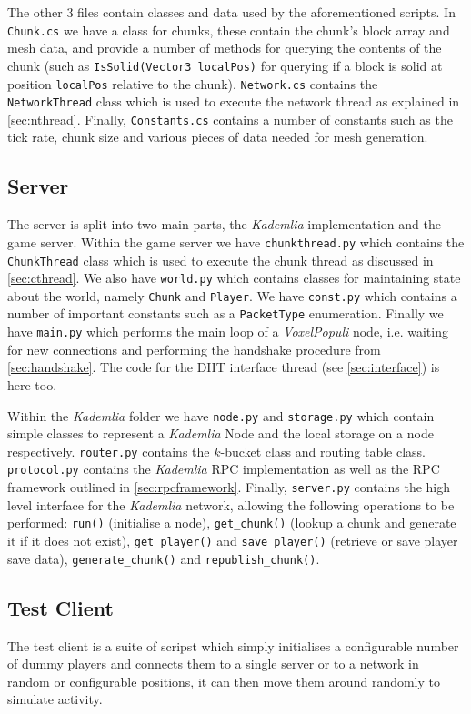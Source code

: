 \documentclass[12pt,notitlepage,a4paper]{report}
\newcommand{\kademlia}{\emph{Kademlia}}
\newcommand{\K}{$k$}
\newcommand{\voxpop}{\emph{VoxelPopuli}}
\begin{document}
	The other $3$ files contain classes and data used by the aforementioned scripts. In {\tt Chunk.cs} we have a class for chunks, these contain the chunk's block array and mesh data, and provide a number of methods for querying the contents of the chunk (such as {\tt IsSolid(Vector3 localPos)} for querying if a block is solid at position {\tt localPos} relative to the chunk). {\tt Network.cs} contains the {\tt NetworkThread} class which is used to execute the network thread as explained in \cref{sec:nthread}. Finally, {\tt Constants.cs} contains a number of constants such as the tick rate, chunk size and various pieces of data needed for mesh generation.
	
	\subsection{Server}
	The server is split into two main parts, the \kademlia{} implementation and the game server. Within the game server we have {\tt chunkthread.py} which contains the {\tt ChunkThread} class which is used to execute the chunk thread as discussed in \cref{sec:cthread}. We also have {\tt world.py} which contains classes for maintaining state about the world, namely {\tt Chunk} and {\tt Player}. We have {\tt const.py} which contains a number of important constants such as a {\tt PacketType} enumeration. Finally we have {\tt main.py} which performs the main loop of a \voxpop{} node, i.e. waiting for new connections and performing the handshake procedure from \cref{sec:handshake}. The code for the DHT interface thread (see \cref{sec:interface}) is here too.
	
	Within the \kademlia{} folder we have {\tt node.py} and {\tt storage.py} which contain simple classes to represent a \kademlia{} Node and the local storage on a node respectively. {\tt router.py} contains the \K-bucket class and routing table class. {\tt protocol.py} contains the \kademlia{} RPC implementation as well as the RPC framework outlined in \cref{sec:rpcframework}. Finally, {\tt server.py} contains the high level interface for the \kademlia{} network, allowing the following operations to be performed: {\tt run()} (initialise a node), {\tt get\_chunk()} (lookup a chunk and generate it if it does not exist), {\tt get\_player()} and {\tt save\_player()} (retrieve or save player save data), {\tt generate\_chunk()} and {\tt republish\_chunk()}.
	
	\subsection{Test Client}
	The test client is a suite of scripst which simply initialises a configurable number of dummy players and connects them to a single server or to a network in random or configurable positions, it can then move them around randomly to simulate activity.
	
\end{document}
